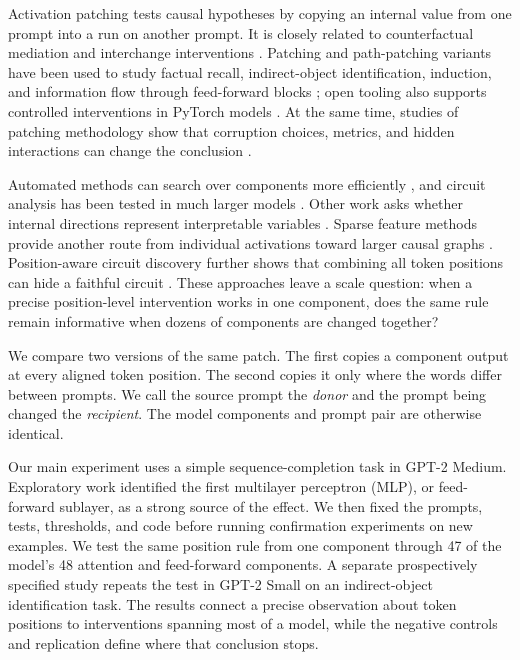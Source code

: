 \documentclass[pdflatex,sn-nature]{sn-jnl}
\begin{document}
Activation patching tests causal hypotheses by copying an internal value from
one prompt into a run on another prompt. It is closely related to
counterfactual mediation and interchange interventions
\citep{pearl2001direct,imai2010general,vig2020causal,geiger2021causalabstractions}.
Patching and path-patching variants have been used to study factual recall,
indirect-object identification, induction, and information flow through
feed-forward blocks
\citep{meng2022locating,wang2022ioi,olsson2022induction,goldowskydill2023path,geva2021transformer,geva2022transformer,geva2023dissecting};
open tooling also supports controlled interventions in PyTorch models
\citep{wu2024pyvene}. At the same time, studies of patching methodology show
that corruption choices, metrics, and hidden interactions can change the
conclusion
\citep{zhang2024activation,heimersheim2024activation,hase2023localization,makelov2024subspace,mueller2024missed,miller2024faithfulness}.

Automated methods can search over components more efficiently
\citep{conmy2023acdc,kramar2024atp,syed2024attribution}, and circuit analysis
has been tested in much larger models \citep{lieberum2023circuitsscale}.
Other work asks whether internal directions represent interpretable variables
\citep{geiger2023causal,geiger2024das,park2024linear}. Sparse feature methods
provide another route from individual activations toward larger causal graphs
\citep{elhage2022superposition,huben2024sparse,templeton2024scaling,marks2025sparsecircuits}.
Position-aware circuit discovery further shows that combining all token
positions can hide a faithful circuit \citep{haklay2025position}. These
approaches leave a scale question: when a precise position-level intervention
works in one component, does the same rule remain informative when dozens of
components are changed together?

We compare two versions of the same patch. The first copies a component output
at every aligned token position. The second copies it only where the words
differ between prompts. We call the source prompt the \emph{donor} and the
prompt being changed the \emph{recipient}. The model components and prompt
pair are otherwise identical.

Our main experiment uses a simple sequence-completion task in GPT-2 Medium.
Exploratory work identified the first multilayer perceptron (MLP), or
feed-forward sublayer, as a strong source of the effect. We then fixed the
prompts, tests, thresholds, and code before running confirmation experiments
on new examples. We test the same position rule from one component through 47
of the model's 48 attention and feed-forward components. A separate
prospectively specified study repeats the test in GPT-2 Small on an indirect-object
identification task. The results connect a precise observation about token
positions to interventions spanning most of a model, while the negative
controls and replication define where that conclusion stops.
\end{document}
